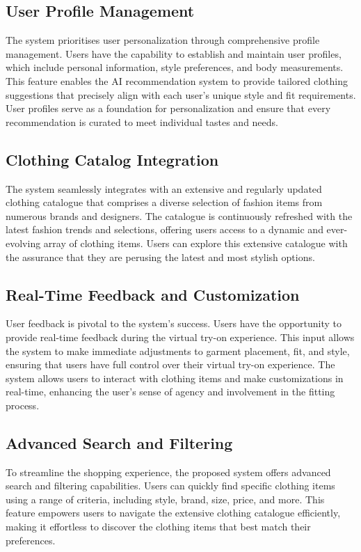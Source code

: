 	\subsection{User Profile Management}
		The system prioritises user personalization through comprehensive profile management. Users have the capability to establish and maintain user profiles, which include personal information, style preferences, and body measurements. This feature enables the AI recommendation system to provide tailored clothing suggestions that precisely align with each user's unique style and fit requirements. User profiles serve as a foundation for personalization and ensure that every recommendation is curated to meet individual tastes and needs.

	\subsection{Clothing Catalog Integration}
		The system seamlessly integrates with an extensive and regularly updated clothing catalogue that comprises a diverse selection of fashion items from numerous brands and designers. The catalogue is continuously refreshed with the latest fashion trends and selections, offering users access to a dynamic and ever-evolving array of clothing items. Users can explore this extensive catalogue with the assurance that they are perusing the latest and most stylish options.

	\subsection{Real-Time Feedback and Customization}
		User feedback is pivotal to the system's success. Users have the opportunity to provide real-time feedback during the virtual try-on experience. This input allows the system to make immediate adjustments to garment placement, fit, and style, ensuring that users have full control over their virtual try-on experience. The system allows users to interact with clothing items and make customizations in real-time, enhancing the user's sense of agency and involvement in the fitting process.

	\subsection{Advanced Search and Filtering}
		To streamline the shopping experience, the proposed system offers advanced search and filtering capabilities. Users can quickly find specific clothing items using a range of criteria, including style, brand, size, price, and more. This feature empowers users to navigate the extensive clothing catalogue efficiently, making it effortless to discover the clothing items that best match their preferences.

